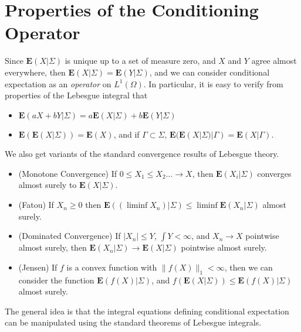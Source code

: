 \section{Properties of the Conditioning Operator}

Since $\mathbf{E}(X|\Sigma)$ is unique up to a set of measure zero, and $X$ and $Y$ agree almost everywhere, then $\mathbf{E}(X|\Sigma) = \mathbf{E}(Y|\Sigma)$, and we can consider conditional expectation as an {\it operator} on $L^1(\Omega)$. In particular, it is easy to verify from properties of the Lebesgue integral that
%
\begin{itemize}
    \item $\mathbf{E}(aX + bY|\Sigma) = a \mathbf{E}(X|\Sigma) + b \mathbf{E}(Y|\Sigma)$
    \item $\mathbf{E}(\mathbf{E}(X|\Sigma)) = \mathbf{E}(X)$, and if $\Gamma \subset \Sigma$, $\mathbf{E}(\mathbf{E}(X|\Sigma)|\Gamma) = \mathbf{E}(X|\Gamma)$.
\end{itemize}
%
We also get variants of the standard convergence results of Lebesgue theory.
%
\begin{itemize}
    \item (Monotone Convergence) If $0 \leq X_1 \leq X_2 \dots \to X$, then $\mathbf{E}(X_i|\Sigma)$ converges almost surely to $\mathbf{E}(X|\Sigma)$.
    \item (Fatou) If $X_n \geq 0$ then $\mathbf{E}((\liminf X_n)|\Sigma) \leq \liminf \mathbf{E}(X_n|\Sigma)$ almost surely.
    \item (Dominated Convergence) If $|X_n| \leq Y$, $\int Y < \infty$, and $X_n \to X$ pointwise almost surely, then $\mathbf{E}(X_n|\Sigma) \to \mathbf{E}(X|\Sigma)$ pointwise almost surely.
    \item (Jensen) If $f$ is a convex function with $\| f(X) \|_1 < \infty$, then we can consider the function $\mathbf{E}(f(X)|\Sigma)$, and $f(\mathbf{E}(X|\Sigma)) \leq \mathbf{E}(f(X)|\Sigma)$ almost surely.
\end{itemize}
%
The general idea is that the integral equations defining conditional expectation can be manipulated using the standard theorems of Lebesgue integrals.

